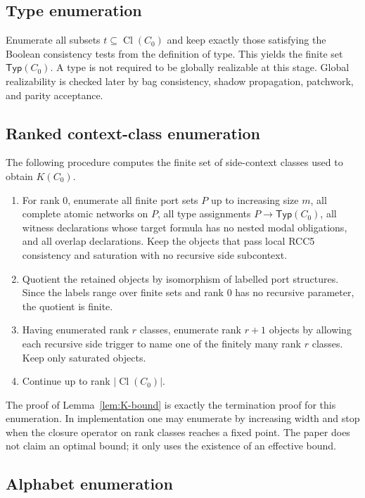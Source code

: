 \documentclass[11pt]{article}
\newcommand{\Cl}{\operatorname{Cl}}
\newcommand{\Typ}{\mathsf{Typ}}
\begin{document}
\subsection{Type enumeration}

Enumerate all subsets $t\subseteq\Cl(C_0)$ and keep exactly those satisfying the Boolean consistency tests from the definition of type.  This yields the finite set $\Typ(C_0)$.  A type is not required to be globally realizable at this stage.  Global realizability is checked later by bag consistency, shadow propagation, patchwork, and parity acceptance.

\subsection{Ranked context-class enumeration}

The following procedure computes the finite set of side-context classes used to obtain $K(C_0)$.

\begin{enumerate}[label=(K\arabic*)]
\item For rank $0$, enumerate all finite port sets $P$ up to increasing size $m$, all complete atomic networks on $P$, all type assignments $P\to\Typ(C_0)$, all witness declarations whose target formula has no nested modal obligations, and all overlap declarations.  Keep the objects that pass local RCC5 consistency and saturation with no recursive side subcontext.
\item Quotient the retained objects by isomorphism of labelled port structures.  Since the labels range over finite sets and rank $0$ has no recursive parameter, the quotient is finite.
\item Having enumerated rank $r$ classes, enumerate rank $r+1$ objects by allowing each recursive side trigger to name one of the finitely many rank $r$ classes.  Keep only saturated objects.
\item Continue up to rank $|\Cl(C_0)|$.
\end{enumerate}

The proof of Lemma~\ref{lem:K-bound} is exactly the termination proof for this enumeration.  In implementation one may enumerate by increasing width and stop when the closure operator on rank classes reaches a fixed point.  The paper does not claim an optimal bound; it only uses the existence of an effective bound.

\subsection{Alphabet enumeration}
\end{document}
